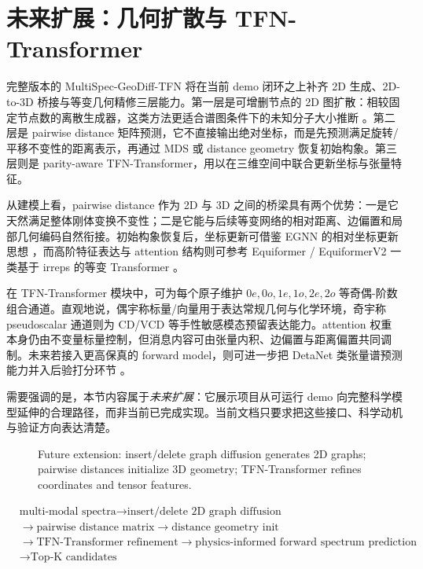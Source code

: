 \section{未来扩展：几何扩散与 TFN-Transformer}
完整版本的 MultiSpec-GeoDiff-TFN 将在当前 demo 闭环之上补齐 2D 生成、2D-to-3D 桥接与等变几何精修三层能力。第一层是可增删节点的 2D 图扩散：相较固定节点数的离散生成器，这类方法更适合谱图条件下的未知分子大小推断 \citep{Ninniri2025GrIDDD}。第二层是 pairwise distance 矩阵预测，它不直接输出绝对坐标，而是先预测满足旋转/平移不变性的距离表示，再通过 MDS 或 distance geometry 恢复初始构象。第三层则是 parity-aware TFN-Transformer，用以在三维空间中联合更新坐标与张量特征。

从建模上看，pairwise distance 作为 2D 与 3D 之间的桥梁具有两个优势：一是它天然满足整体刚体变换不变性；二是它能与后续等变网络的相对距离、边偏置和局部几何编码自然衔接。初始构象恢复后，坐标更新可借鉴 EGNN 的相对坐标更新思想 \citep{Satorras2021EGNN}，而高阶特征表达与 attention 结构则可参考 Equiformer / EquiformerV2 一类基于 irreps 的等变 Transformer \citep{Liao2022Equiformer,Liao2024EquiformerV2}。

在 TFN-Transformer 模块中，可为每个原子维护 $0e,0o,1e,1o,2e,2o$ 等奇偶-阶数组合通道。直观地说，偶宇称标量/向量用于表达常规几何与化学环境，奇宇称 pseudoscalar 通道则为 CD/VCD 等手性敏感模态预留表达能力。attention 权重本身仍由不变量标量控制，但消息内容可由张量内积、边偏置与距离偏置共同调制。未来若接入更高保真的 forward model，则可进一步把 DetaNet 类张量谱预测能力并入后验打分环节 \citep{Zou2023DetaNet}。

需要强调的是，本节内容属于\emph{未来扩展}：它展示项目从可运行 demo 向完整科学模型延伸的合理路径，而非当前已完成实现。当前文档只要求把这些接口、科学动机与验证方向表达清楚。

\begin{figure}[htbp]
  \centering
  
  \caption{Future extension: insert/delete graph diffusion generates 2D graphs; pairwise distances initialize 3D geometry; TFN-Transformer refines coordinates and tensor features.}
\end{figure}

\begin{keybox}[未来完整路径]
{\small
\[
\begin{aligned}
&\text{multi-modal spectra}
\rightarrow
\text{insert/delete 2D graph diffusion}\\
&\rightarrow
\text{pairwise distance matrix}
\rightarrow
\text{distance geometry init}\\
&\rightarrow
\text{TFN-Transformer refinement}
\rightarrow
\text{physics-informed forward spectrum prediction}\\
&\rightarrow
\text{Top-K candidates}
\end{aligned}
\]
}
\end{keybox}
